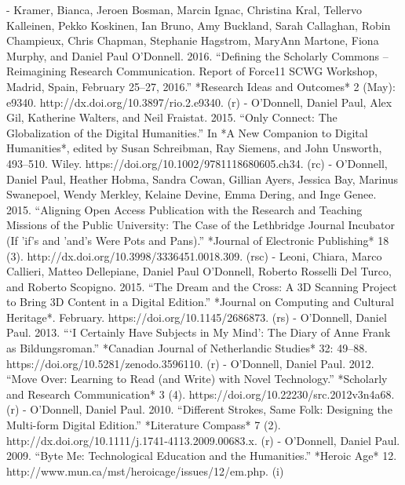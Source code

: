 - Kramer, Bianca, Jeroen Bosman, Marcin Ignac, Christina Kral, Tellervo Kalleinen, Pekko Koskinen, Ian Bruno, Amy Buckland, Sarah Callaghan, Robin Champieux, Chris Chapman, Stephanie Hagstrom, MaryAnn Martone, Fiona Murphy, and Daniel Paul O'Donnell. 2016. “Defining the Scholarly Commons – Reimagining Research Communication. Report of Force11 SCWG Workshop, Madrid, Spain, February 25–27, 2016.” *Research Ideas and Outcomes* 2 (May): e9340. http:/\allowbreak{}/\allowbreak{}dx.doi.org/\allowbreak{}10.3897/\allowbreak{}rio.2.e9340. (r)
- O'Donnell, Daniel Paul, Alex Gil, Katherine Walters, and Neil Fraistat. 2015. “Only Connect: The Globalization of the Digital Humanities.” In *A New Companion to Digital Humanities*, edited by Susan Schreibman, Ray Siemens, and John Unsworth, 493–510. Wiley. https:/\allowbreak{}/\allowbreak{}doi.org/\allowbreak{}10.1002/\allowbreak{}9781118680605.ch34. (rc)
- O'Donnell, Daniel Paul, Heather Hobma\*, Sandra Cowan, Gillian Ayers\*, Jessica Bay\*, Marinus Swanepoel, Wendy Merkley, Kelaine Devine\*, Emma Dering\*, and Inge Genee. 2015. “Aligning Open Access Publication with the Research and Teaching Missions of the Public University: The Case of the Lethbridge Journal Incubator (If 'if's and 'and's Were Pots and Pans).” *Journal of Electronic Publishing* 18 (3). http:/\allowbreak{}/\allowbreak{}dx.doi.org/\allowbreak{}10.3998/\allowbreak{}3336451.0018.309. (rsc)
- Leoni, Chiara\*, Marco Callieri, Matteo Dellepiane, Daniel Paul O'Donnell, Roberto Rosselli Del Turco, and Roberto Scopigno. 2015. “The Dream and the Cross: A 3D Scanning Project to Bring 3D Content in a Digital Edition.” *Journal on Computing and Cultural Heritage*. February. https:/\allowbreak{}/\allowbreak{}doi.org/\allowbreak{}10.1145/\allowbreak{}2686873. (rs)
- O'Donnell, Daniel Paul. 2013. “‘I Certainly Have Subjects in My Mind’: The Diary of Anne Frank as Bildungsroman.” *Canadian Journal of Netherlandic Studies* 32: 49–88. https:/\allowbreak{}/\allowbreak{}doi.org/\allowbreak{}10.5281/\allowbreak{}zenodo.3596110. (r)
- O'Donnell, Daniel Paul. 2012. “Move Over: Learning to Read (and Write) with Novel Technology.” *Scholarly and Research Communication* 3 (4). https:/\allowbreak{}/\allowbreak{}doi.org/\allowbreak{}10.22230/\allowbreak{}src.2012v3n4a68. (r)
- O'Donnell, Daniel Paul. 2010. “Different Strokes, Same Folk: Designing the Multi-form Digital Edition.” *Literature Compass* 7 (2). http:/\allowbreak{}/\allowbreak{}dx.doi.org/\allowbreak{}10.1111/\allowbreak{}j.1741-4113.2009.00683.x. (r)
- O'Donnell, Daniel Paul. 2009. “Byte Me: Technological Education and the Humanities.” *Heroic Age* 12. http:/\allowbreak{}/\allowbreak{}www.mun.ca/\allowbreak{}mst/\allowbreak{}heroicage/\allowbreak{}issues/\allowbreak{}12/\allowbreak{}em.php. (i)
